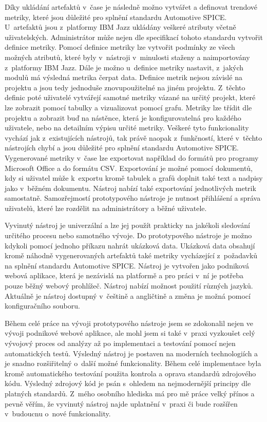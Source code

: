 \documentclass[czech,master]{diploma}
\begin{document}
Díky ukládání artefaktů v~čase je následně možno vytvářet a definovat trendové metriky, které jsou důležité pro splnění standardu Automotive SPICE. U~artefaktů jsou z~platformy IBM Jazz ukládány veškeré atributy včetně uživatelských. Administrátor může nejen dle specifikací tohoto standardu vytvořit definice metriky. Pomocí definice metriky lze vytvořit podmínky ze všech možných atributů, které byly v~nástroji v~minulosti staženy a naimportovány z~platformy IBM Jazz. Dále je možno u~definice metriky nastavit, z~jakých modulů má výsledná metrika čerpat data. Definice metrik nejsou závislé na projektu a jsou tedy jednoduše znovupoužitelné na jiném projektu. Z~těchto definic poté uživatelé vytvářejí samotné metriky vázané na určitý projekt, které lze zobrazit pomocí tabulky a vizualizovat pomocí grafu. Metriky lze třídit dle projektu a zobrazit buď na nástěnce, která je konfigurovatelná pro každého uživatele, nebo na detailním výpisu určité metriky. Veškeré tyto funkcionality vychází jak z~existujících nástrojů, tak právě naopak z~funkčností, které v~těchto nástrojích chybí a jsou důležité pro splnění standardu Automotive SPICE. Vygenerované metriky v~čase lze exportovat například do formátů pro programy Microsoft Office a do formátu CSV. Exportování je možné pomocí dokumentů, kdy si uživatel může k~exportu kromě tabulek a grafů doplnit také text a nadpisy jako v~běžném dokumentu. Nástroj nabízí také exportování jednotlivých metrik samostatně. Samozřejmostí prototypového nástroje je nutnost přihlášení a správa uživatelů, které lze rozdělit na administrátory a běžné uživatele.

Vyvinutý nástroj je univerzální a lze jej použít prakticky na jakékoli sledování určitého procesu nebo samotného vývoje. Do prototypového nástroje je možno kdykoli pomocí jednoho příkazu nahrát ukázková data. Ukázková data obsahují kromě náhodně vygenerovaných artefaktů také metriky vycházející z~požadavků na splnění standardu Automotive SPICE. Nástroj je vytvořen jako podniková webová aplikace, která je nezávislá na platformě a pro práci v~ní je potřeba pouze běžný webový prohlížeč. Nástroj nabízí možnost použití různých jazyků. Aktuálně je nástroj dostupný v~češtině a angličtině a změna je možná pomocí konfiguračního souboru.

Během celé práce na vývoji prototypového nástroje jsem se zdokonalil nejen ve vývoji podnikové webové aplikace, ale mohl jsem si také v~praxi vyzkoušet celý vývojový proces od analýzy až po implementaci a testování pomocí nejen automatických testů. Výsledný nástroj je postaven na moderních technologiích a je snadno rozšiřitelný o~další možné funkcionality. Během celé implementace byla kromě automatického testování použita kontrola a oprava standardů zdrojového kódu. Výsledný zdrojový kód je psán s~ohledem na nejmodernější principy dle platných standardů. Z~mého osobního hlediska má pro mě práce velký přínos a pevně věřím, že vyvinutý nástroj najde uplatnění v~praxi či bude rozšířen v~budoucnu o~nové funkcionality.
\end{document}
